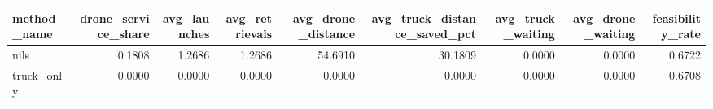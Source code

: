 \begin{tabular}{lrrrrrrrr}
\toprule
method_name & drone_service_share & avg_launches & avg_retrievals & avg_drone_distance & avg_truck_distance_saved_pct & avg_truck_waiting & avg_drone_waiting & feasibility_rate \\
\midrule
nils & 0.1808 & 1.2686 & 1.2686 & 54.6910 & 30.1809 & 0.0000 & 0.0000 & 0.6722 \\
truck_only & 0.0000 & 0.0000 & 0.0000 & 0.0000 & 0.0000 & 0.0000 & 0.0000 & 0.6708 \\
\bottomrule
\end{tabular}

